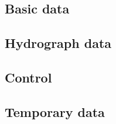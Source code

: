     \subsection{Basic data}
    \subsection{Hydrograph data}
    \subsection{Control}
    \subsection{Temporary data}
